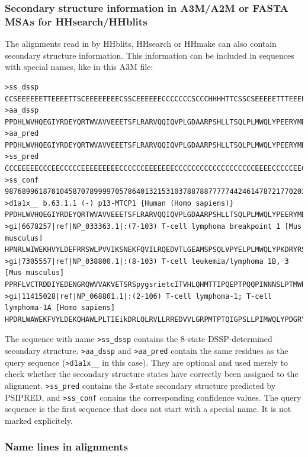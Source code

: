 \documentclass[11pt,a4paper]{article}
\begin{document}
\subsubsection*{Secondary structure information in A3M/A2M or FASTA MSAs for HHsearch/HHblits}

The alignments read in by HHblits, HHsearch or HHmake can also contain secondary structure 
information. This information can be included in sequences with special names, 
like in this A3M file:

\scriptsize\begin{verbatim}
>ss_dssp
CCSEEEEEETTEEEETTSCEEEEEEEECSSCEEEEEECCCCCCCSCCCHHHHTTCSSCSEEEEETTTEEEETTSC
>aa_dssp
PPDHLWVHQEGIYRDEYQRTWVAVVEEETSFLRARVQQIQVPLGDAARPSHLLTSQLPLMWQLYPEERYMDNNSR
>aa_pred 
PPDHLWVHQEGIYRDEYQRTWVAVVEEETSFLRARVQQIQVPLGDAARPSHLLTSQLPLMWQLYPEERYMDNNSR
>ss_pred 
CCCEEEEECCCEECCCCCEEEEEEEEECCCCCCEEEEEEECCCCCCCCCCCCCCCCCCCEEEECCCCCEECCCCC
>ss_conf 
987689961870104587078999970578640132153103788788777774424614787217702035631
>d1a1x__ b.63.1.1 (-) p13-MTCP1 {Human (Homo sapiens)}
PPDHLWVHQEGIYRDEYQRTWVAVVEEETSFLRARVQQIQVPLGDAARPSHLLTSQLPLMWQLYPEERYMDNNSR
>gi|6678257|ref|NP_033363.1|:(7-103) T-cell lymphoma breakpoint 1 [Mus musculus]
HPNRLWIWEKHVYLDEFRRSWLPVVIKSNEKFQVILRQEDVTLGEAMSPSQLVPYELPLMWQLYPKDRYRSCDSM
>gi|7305557|ref|NP_038800.1|:(8-103) T-cell leukemia/lymphoma 1B, 3 [Mus musculus]
PPRFLVCTRDDIYEDENGRQWVVAKVETSRSpygsrietcITVHLQHMTTIPQEPTPQQPINNNSLPTMWRLESMNTYTGTDGT
>gi|11415028|ref|NP_068801.1|:(2-106) T-cell lymphoma-1; T-cell lymphoma-1A [Homo sapiens]
HPDRLWAWEKFVYLDEKQHAWLPLTIEikDRLQLRVLLRREDVVLGRPMTPTQIGPSLLPIMWQLYPDGRYRSSDSS
\end{verbatim}\normalsize

The sequence with name \verb`>ss_dssp` contains the 8-state DSSP-determined secondary
structure. \verb`>aa_dssp` and \verb`>aa_pred` contain the same residues as the query 
sequence (\verb`>d1a1x__` in this case). They are optional and used merely to check whether the 
secondary structure states have correctly been assigned to the alignment. \verb`>ss_pred` 
contains the 3-state secondary structure predicted by PSIPRED, and \verb`>ss_conf`
 conains the corresponding confidence values. The query sequence is the first sequence that 
does not start with a special name. It is not marked explicitely.


\subsubsection*{Name lines in alignments}
\end{document}

